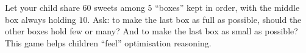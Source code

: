 {\begin{parentbox}Let your child share $60$ sweets among $5$ ``boxes'' kept in order, with the middle box always holding $10$. Ask: to make the last box as full as possible, should the other boxes hold few or many? And to make the last box as small as possible? This game helps children ``feel'' optimisation reasoning.\end{parentbox}

}
